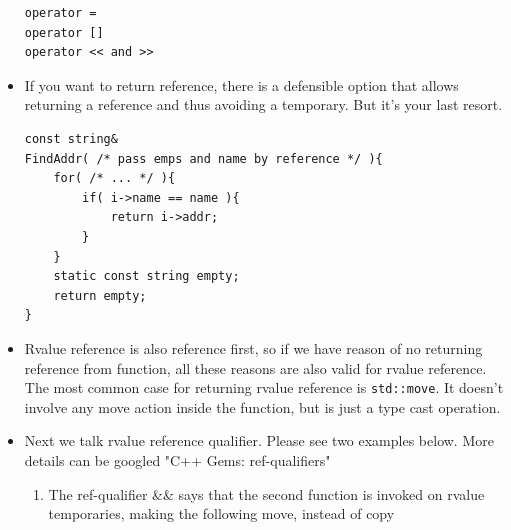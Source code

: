 \documentclass[a4paper,11pt,twoside]{book}
\begin{document}
\begin{itemize}
\begin{lstlisting}[numbers=none]
operator =
operator []
operator << and >>
\end{lstlisting}
	
	\item If you want to return reference,  there is a defensible option that allows returning a reference and thus avoiding a temporary. But it's your last resort.
\begin{lstlisting}[numbers=none]
const string&
FindAddr( /* pass emps and name by reference */ ){
	for( /* ... */ ){
		if( i->name == name ){
			return i->addr;
		}
	}
	static const string empty;
	return empty;
}
\end{lstlisting}

	\item Rvalue reference is also reference first, so if we have reason of no returning reference from function, all these reasons are also valid for rvalue reference. The most common case for returning rvalue reference is \texttt{std::move}. It doesn't involve any move action inside the function, but is just a type cast operation.
	
%	
%	
%	
 
	
	\item Next we talk rvalue reference qualifier. Please see two examples below. More details can be googled  "C++ Gems: ref-qualifiers"
	\begin{enumerate}

		\item The ref-qualifier \&\& says that the second function is invoked on rvalue temporaries, making the following move, instead of copy
	

\end{enumerate}
\end{itemize}
\end{document}
